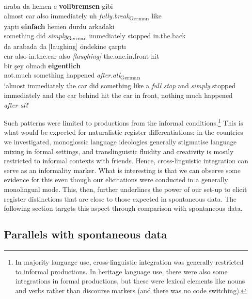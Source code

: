 \documentclass[output=paper,colorlinks,citecolor=brown]{langscibook}
\begin{document}
\z

\ea\label{ex:ch1:ex16}

 {araba} {da} {hemen} {e} {\textbf{vollbremsen}} {gibi} \\
almost car also immediately uh \textit{fully.break}\textsubscript{German} like \\
\sn {} { yaptı} {\textbf{einfach}} {hemen} {durdu} {arkadaki}  \\
something did \textit{simply}\textsubscript{German} immediately stopped in.the.back \\
\sn {} {da} {arabada} {da} {[laughing]} {öndekine} {çarptı} \\
 car also in.the.car also \textit{[laughing]} the.one.in.front hit \\
\sn {} {bir şey} {olmad{ı}} {\textbf{eigentlich}} \\
not.much something happened \textit{after.all}\textsubscript{German} \\
\trans `almost immediately the car did something like a \textit{full stop} and \textit{simply} stopped immediately and the car behind hit the car in front, nothing much happened \textit{after all}' \hspace{\fill}{[DEbi52FT\_isT]}
 
\z

Such patterns were limited to productions from the informal conditions.\footnote{In majority language use, cross-linguistic integration was generally restricted to informal productions. In heritage language use, there were also some integrations in formal productions, but these were lexical elements like nouns and verbs rather than discourse markers (and there was no code switching).} This is what would be expected for naturalistic register differentiations: in the countries we investigated, monoglossic language ideologies generally stigmatise language mixing in formal settings, and translinguistic fluidity and creativity is mostly restricted to informal contexts with friends. Hence, cross-linguistic integration can serve as an informality marker. What is interesting is that we can observe some evidence for this even though our elicitations were conducted in a generally monolingual mode. This, then, further underlines the power of our set-up to elicit register distinctions that are close to those expected in spontaneous data. The following section targets this aspect through comparison with spontaneous data.

\subsection{Parallels with spontaneous data} \label{ch1:sec:3.2}
\end{document}

